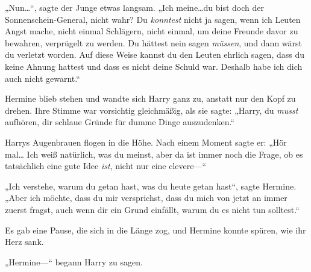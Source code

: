 „Nun…“, sagte der Junge etwas langsam. „Ich meine…du bist doch der Sonnenschein-General, nicht wahr? Du \emph{konntest} nicht ja sagen, wenn ich Leuten Angst mache, nicht einmal Schlägern, nicht einmal, um deine Freunde davor zu bewahren, verprügelt zu werden. Du hättest nein sagen \emph{müssen}, und dann wärst du verletzt worden. Auf diese Weise kannst du den Leuten ehrlich sagen, dass du keine Ahnung hattest und dass es nicht deine Schuld war. Deshalb habe ich dich auch nicht gewarnt.“

Hermine blieb stehen und wandte sich Harry ganz zu, anstatt nur den Kopf zu drehen. Ihre Stimme war vorsichtig gleichmäßig, als sie sagte: „Harry, du \emph{musst} aufhören, dir schlaue Gründe für dumme Dinge auszudenken.“

Harrys Augenbrauen flogen in die Höhe. Nach einem Moment sagte er: „Hör mal… Ich weiß natürlich, was du meinst, aber da ist immer noch die Frage, ob es tatsächlich eine gute Idee \emph{ist}, nicht nur eine clevere—“

„Ich verstehe, warum du getan hast, was du heute getan hast“, sagte Hermine. „Aber ich möchte, dass du mir versprichst, dass du mich von jetzt an immer zuerst fragst, auch wenn dir ein Grund einfällt, warum du es nicht tun solltest.“

Es gab eine Pause, die sich in die Länge zog, und Hermine konnte spüren, wie ihr Herz sank.

„Hermine—“ begann Harry zu sagen.

